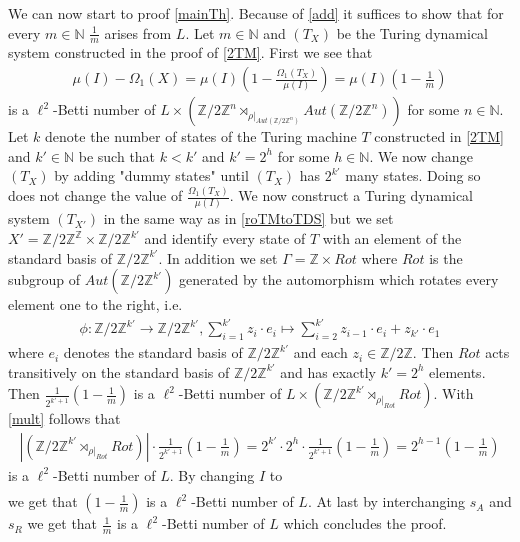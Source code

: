 \documentclass[12pt,a4paper]{scrartcl}
\theoremstyle{plain}
\theoremstyle{definition}
\numberwithin{equation}{section}
\newcommand{\Z}{\mathbb{Z}} %
\newcommand{\N}{\mathbb{N}} %
\newcommand{\2}{\mathbb{Z} / 2 \mathbb{Z}}
\newcommand{\1}{\bar{1}}
\newcommand{\0}{\bar{0}}
\begin{document}
We can now start to proof \ref{mainTh}. Because of \ref{add} it suffices to show that for every $m \in \N$ $\frac{1}{m}$ arises from $L$. Let $m \in \N$  and $(T_X)$ be the Turing dynamical system constructed in the proof of \ref{2TM}. First we see that
\begin{align*}
	\mu (I) - \Omega_1(X) = \mu (I) (1 - \frac{\Omega_1(T_X)}{\mu(I)}) = \mu (I) (1 - \frac{1}{m})
\end{align*}
is a $\ell^2$-Betti number of $L \times (\2^n \rtimes_{\rho|_{Aut(\2^n)}} Aut(\2^n))$ for some $n \in \N$. Let $k$ denote the number of states of the Turing machine $T$ constructed in \ref{2TM} and $k' \in \N$ be such that $k < k'$ and $k' = 2^{h}$ for some $h \in \N$. We now change $(T_X)$ by adding "dummy states" until $(T_X)$ has $2^{k'}$ many states. Doing so does not change the value of $\frac{\Omega_1(T_X)}{\mu(I)}$. We now construct a Turing dynamical system $(T_{X'})$ in the same way as in \ref{roTMtoTDS} but we set $X' = \2^\Z \times \2^{k'}$ and identify every state of $T$ with an element of the standard basis of $\2^{k'}$. In addition we set $\Gamma = \Z \times Rot$ where $Rot$ is the subgroup of $Aut(\2^{k'})$ generated by the automorphism which rotates every element one to the right, i.e.
\begin{align*}
	\phi : \2^{k'} \to \2^{k'}, \sum_{i =1}^{k'}z_i \cdot e_i \mapsto \sum_{i =2}^{k'}z_{i - 1} \cdot e_i + z_{k'} \cdot e_1
\end{align*}
where $e_i$ denotes the standard basis of $\2^{k'}$ and each $z_i \in \2$. Then $Rot$ acts transitively on the standard basis of $\2^{k'}$ and has exactly $k' = 2^{h}$ elements. Then $\frac{1}{2^{k' + 1}} (1 - \frac{1}{m})$ is a $\ell^2$-Betti number of $L \times (\2^{k'} \rtimes_{\rho|_{Rot}} Rot)$. With \ref{mult} follows that 
\begin{align*}
	|(\2^{k'} \rtimes_{\rho|_{Rot}} Rot)| \cdot \frac{1}{2^{k' + 1}} (1 - \frac{1}{m}) = 2^{k'} \cdot 2^h \cdot \frac{1}{2^{k' + 1}} (1 - \frac{1}{m}) = 2^{h -1} (1 - \frac{1}{m})
\end{align*}
is a $\ell^2$-Betti number of $L$. By changing $I$ to
\begin{align*}
	[\1^{h-1} \underline{\1}][s_I]
\end{align*}
we get that $(1 - \frac{1}{m})$ is a $\ell^2$-Betti number of $L$. At last by interchanging $s_A$ and $s_R$ we get that $\frac{1}{m}$ is a $\ell^2$-Betti number of $L$ which concludes the proof.
\end{document}

